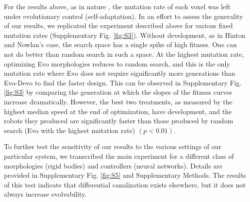 For the results above, as in nature \cite{lynch2010evolution}, the mutation rate of each voxel was left under evolutionary control (self-adaptation).
In an effort to assess the generality of our results, we replicated the experiment described above for various fixed mutation rates (Supplementary Fig. \ref{fig:S3}).%
Without development, as in Hinton and Nowlan's case\cite{hinton1987learning}, the search space has a single spike of high fitness. 
One can not do better than random search in such a space.
At the highest mutation rate, optimizing Evo morphologies reduces to random search, and this is the only mutation rate where Evo does not require significantly more generations than Evo-Devo to find the faster design. 
This can be observed in Supplementary Fig. \ref{fig:S3}  %
by comparing the generation at which the slopes of the fitness curves increase dramatically. 
However, the best two treatments, as measured by the highest median speed at the end of optimization, have development, and the robots they produced are significantly faster than those produced by random search (Evo with the highest mutation rate) $(p<0.01)$.

To further test the sensitivity of our results to the various settings of our particular system,
we transcribed the main experiment for a different class of morphologies (rigid bodies) and controllers (neural networks).
Details are provided in Supplementary Fig. \ref{fig:S5} %
and Supplementary Methods.
The results of this test indicate that differential canalization exists elsewhere, but it does not always increase evolvability.  


